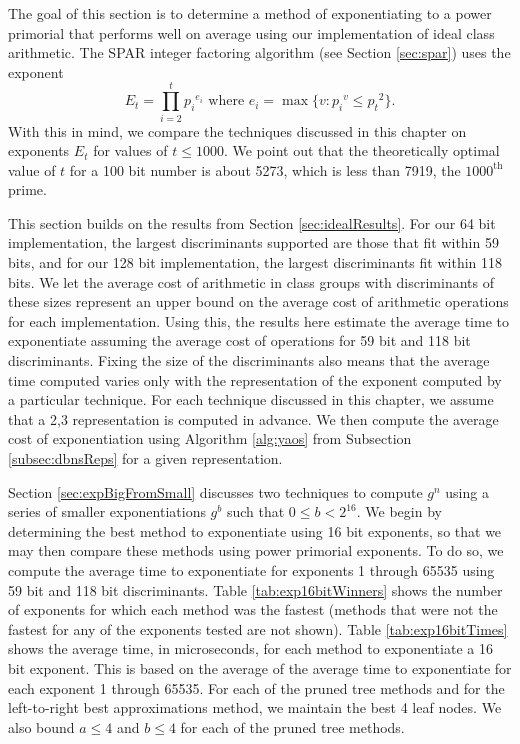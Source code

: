 \documentclass{ucalgthes1}
\theoremstyle{definition}
\begin{document}
The goal of this section is to determine a method of exponentiating to a power primorial that performs well on average using our implementation of ideal class arithmetic.  The SPAR integer factoring algorithm (see Section \ref{sec:spar}) uses the exponent
\begin{equation}
\label{eq:expE}
	E_t = \prod_{i=2}^t {p_i}^{e_i} \textrm{ where } e_i = \max \{ v : {p_i}^v \le {p_t}^2 \}.
\end{equation}
With this in mind, we compare the techniques discussed in this chapter on exponents $E_t$ for values of $t \le 1000$.  We point out that the theoretically optimal value of $t$ for a 100 bit number is about 5273, which is less than 7919, the $1000^{\textrm{th}}$ prime.

This section builds on the results from Section \ref{sec:idealResults}.  For our 64 bit implementation, the largest discriminants supported are those that fit within 59 bits, and for our 128 bit implementation, the largest discriminants fit within 118 bits.  We let the average cost of arithmetic in class groups with discriminants of these sizes represent an upper bound on the average cost of arithmetic operations for each implementation.  Using this, the results here estimate the average time to exponentiate assuming the average cost of operations for 59 bit and 118 bit discriminants.  Fixing the size of the discriminants also means that the average time computed varies only with the representation of the exponent computed by a particular technique.  For each technique discussed in this chapter, we assume that a 2,3 representation is computed in advance.  We then compute the average cost of exponentiation using Algorithm \ref{alg:yaos} from Subsection \ref{subsec:dbnsReps} for a given representation.

Section \ref{sec:expBigFromSmall} discusses two techniques to compute $g^n$ using a series of smaller exponentiations $g^b$ such that $0 \le b < 2^{16}$.  We begin by determining the best method to exponentiate using 16 bit exponents, so that we may then compare these methods using power primorial exponents.  To do so, we compute the average time to exponentiate for exponents 1 through 65535 using 59 bit and 118 bit discriminants.  Table \ref{tab:exp16bitWinners} shows the number of exponents for which each method was the fastest (methods that were not the fastest for any of the exponents tested are not shown).  Table \ref{tab:exp16bitTimes} shows the average time, in microseconds, for each method to exponentiate a 16 bit exponent.  This is based on the average of the average time to exponentiate for each exponent 1 through 65535.  For each of the pruned tree methods and for the left-to-right best approximations method, we maintain the best 4 leaf nodes.  We also bound $a \le 4$ and $b \le 4$ for each of the pruned tree methods.
\end{document}

